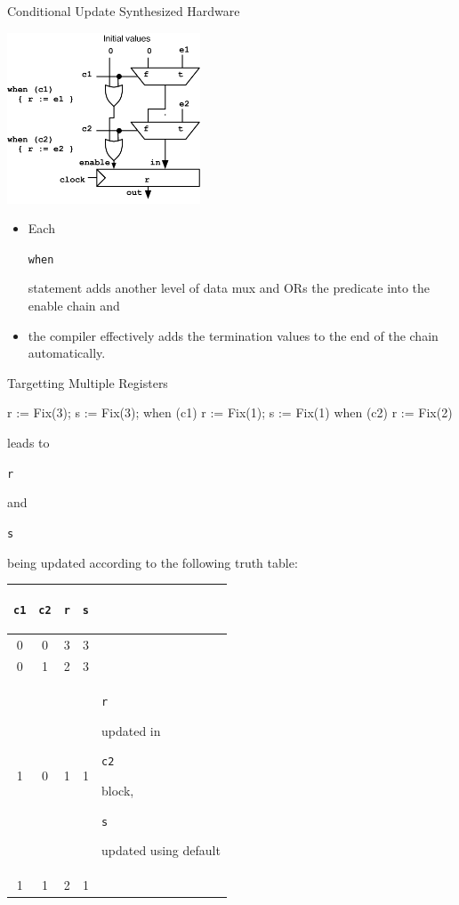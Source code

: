 \documentclass[xcolor=pdflatex,dvipsnames,table]{beamer}
\newcommand{\kode}[1]{\begin{footnotesize}{\tt #1}\end{footnotesize}}
\begin{document}
\begin{frame}[fragile]{Conditional Update Synthesized Hardware}

{\centering
\includegraphics[height=2in]{figs/condupdates.pdf}
}

\begin{itemize}
\item Each \kode{when} statement adds another level of data mux and ORs
  the predicate into the enable chain and
\item the compiler effectively adds
  the termination values to the end of the chain automatically.
\end{itemize}

\end{frame}

\begin{frame}[fragile]{Targetting Multiple Registers}

\begin{scala}
r := Fix(3); 
s := Fix(3);
when (c1) { r := Fix(1); s := Fix(1) }
when (c2) { r := Fix(2) }
\end{scala}

leads to \kode{r} and \kode{s} being updated according to the
following truth table:

{\footnotesize
\begin{center}
\begin{tabular}{|c|c|c|c|l|}
\hline
\kode{c1} & \kode{c2}  & \kode{r} & \kode{s} & \\
\hline 
0 &  0 & 3 & 3 & \\
0 &  1 & 2 & 3 & \\ 
1 &  0 & 1 & 1 & \kode{r} updated in \kode{c2} block, \kode{s} updated using default \\
1 &  1 & 2 & 1 & \\
\hline
\end{tabular}
\end{center}
}


\end{frame}
\end{document}

